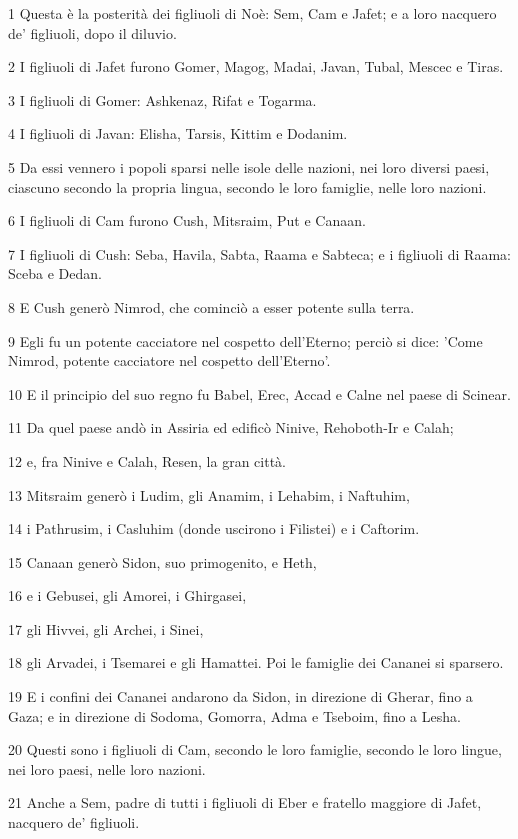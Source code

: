 \par 1 Questa è la posterità dei figliuoli di Noè: Sem, Cam e Jafet; e a loro nacquero de' figliuoli, dopo il diluvio.
\par 2 I figliuoli di Jafet furono Gomer, Magog, Madai, Javan, Tubal, Mescec e Tiras.
\par 3 I figliuoli di Gomer: Ashkenaz, Rifat e Togarma.
\par 4 I figliuoli di Javan: Elisha, Tarsis, Kittim e Dodanim.
\par 5 Da essi vennero i popoli sparsi nelle isole delle nazioni, nei loro diversi paesi, ciascuno secondo la propria lingua, secondo le loro famiglie, nelle loro nazioni.
\par 6 I figliuoli di Cam furono Cush, Mitsraim, Put e Canaan.
\par 7 I figliuoli di Cush: Seba, Havila, Sabta, Raama e Sabteca; e i figliuoli di Raama: Sceba e Dedan.
\par 8 E Cush generò Nimrod, che cominciò a esser potente sulla terra.
\par 9 Egli fu un potente cacciatore nel cospetto dell'Eterno; perciò si dice: 'Come Nimrod, potente cacciatore nel cospetto dell'Eterno'.
\par 10 E il principio del suo regno fu Babel, Erec, Accad e Calne nel paese di Scinear.
\par 11 Da quel paese andò in Assiria ed edificò Ninive, Rehoboth-Ir e Calah;
\par 12 e, fra Ninive e Calah, Resen, la gran città.
\par 13 Mitsraim generò i Ludim, gli Anamim, i Lehabim, i Naftuhim,
\par 14 i Pathrusim, i Casluhim (donde uscirono i Filistei) e i Caftorim.
\par 15 Canaan generò Sidon, suo primogenito, e Heth,
\par 16 e i Gebusei, gli Amorei, i Ghirgasei,
\par 17 gli Hivvei, gli Archei, i Sinei,
\par 18 gli Arvadei, i Tsemarei e gli Hamattei. Poi le famiglie dei Cananei si sparsero.
\par 19 E i confini dei Cananei andarono da Sidon, in direzione di Gherar, fino a Gaza; e in direzione di Sodoma, Gomorra, Adma e Tseboim, fino a Lesha.
\par 20 Questi sono i figliuoli di Cam, secondo le loro famiglie, secondo le loro lingue, nei loro paesi, nelle loro nazioni.
\par 21 Anche a Sem, padre di tutti i figliuoli di Eber e fratello maggiore di Jafet, nacquero de' figliuoli.
